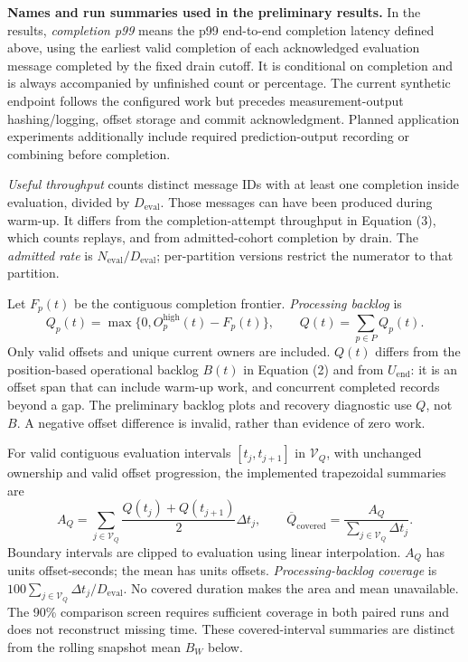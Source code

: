\noindent\textbf{Names and run summaries used in the preliminary results.}
In the results, \emph{completion p99} means the p99 end-to-end completion latency defined above, using the earliest valid completion of each acknowledged evaluation message completed by the fixed drain cutoff. It is conditional on completion and is always accompanied by unfinished count or percentage. The current synthetic endpoint follows the configured work but precedes measurement-output hashing/logging, offset storage and commit acknowledgment. Planned application experiments additionally include required prediction-output recording or combining before completion.

\emph{Useful throughput} counts distinct message IDs with at least one completion inside evaluation, divided by $D_{\mathrm{eval}}$. Those messages can have been produced during warm-up. It differs from the completion-attempt throughput in Equation (3), which counts replays, and from admitted-cohort completion by drain. The \emph{admitted rate} is $N_{\mathrm{eval}}/D_{\mathrm{eval}}$; per-partition versions restrict the numerator to that partition.

Let $F_p(t)$ be the contiguous completion frontier. \emph{Processing backlog} is
\[
Q_p(t)=\max\{0,O_p^{\mathrm{high}}(t)-F_p(t)\},\qquad Q(t)=\sum_{p\in P}Q_p(t).
\]
Only valid offsets and unique current owners are included. $Q(t)$ differs from the position-based operational backlog $B(t)$ in Equation (2) and from $U_{\mathrm{end}}$: it is an offset span that can include warm-up work, and concurrent completed records beyond a gap. The preliminary backlog plots and recovery diagnostic use $Q$, not $B$. A negative offset difference is invalid, rather than evidence of zero work.

For valid contiguous evaluation intervals $[t_j,t_{j+1}]$ in $\mathcal V_Q$, with unchanged ownership and valid offset progression, the implemented trapezoidal summaries are
\[
A_Q=\sum_{j\in\mathcal V_Q}\frac{Q(t_j)+Q(t_{j+1})}{2}\Delta t_j,\qquad
\overline Q_{\mathrm{covered}}=\frac{A_Q}{\sum_{j\in\mathcal V_Q}\Delta t_j}.
\]
Boundary intervals are clipped to evaluation using linear interpolation. $A_Q$ has units offset-seconds; the mean has units offsets. \emph{Processing-backlog coverage} is $100\sum_{j\in\mathcal V_Q}\Delta t_j/D_{\mathrm{eval}}$. No covered duration makes the area and mean unavailable. The 90\% comparison screen requires sufficient coverage in both paired runs and does not reconstruct missing time. These covered-interval summaries are distinct from the rolling snapshot mean $B_W$ below.

